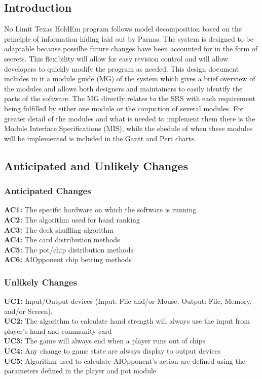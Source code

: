 \documentclass[11pt]{article}
\begin{document}
    \subsection{Introduction}
    No Limit Texas HoldEm program follows model decomposition based on the principle of information hiding laid out by Parnas. The system is designed to be adaptable because possilbe future changes have been accounted for in the form of secrets. This flexibility will allow for easy revision control and will allow developers to quickly modify the program as needed. This design document includes in it a module guide (MG) of the system which gives a brief overview of the modules and allows both designers and maintainers to easily identify the parts of the software. The MG directly relates to the SRS with each requirement being fulfilled by either one module or the conjuction of several modules. For greater detail of the modules and what is needed to implement them there is the Module Interface Specifications (MIS), while the shedule of when these modules will be implemented is included in the Gantt and Pert charts.
    \subsection{Anticipated and Unlikely Changes}
    \subsubsection{Anticipated Changes}
    \textbf{AC1:} The specific hardware on which the software is running\\
    \textbf{AC2:} The algorithm used for hand ranking\\
    \textbf{AC3:} The deck shuffling algorithm\\
    \textbf{AC4:} The card distribution methods\\
    \textbf{AC5:} The pot/chip distribution methods\\
    \textbf{AC6:} AIOpponent chip betting methods\\
    
     
    \subsubsection{Unlikely Changes}
    \textbf{UC1:} Input/Output devices (Input: File and/or Mouse, Output: File, Memory, and/or Screen).\\
    \textbf{UC2:} The algorithm to calculate hand strength will always use the input from player’s hand and community card\\
    \textbf{UC3:} The game will always end when a player runs out of chips\\
    \textbf{UC4:} Any change to game state are always display to output devices\\
    \textbf{UC5:} Algorithm used to calculate AIOpponent’s action are defined using the parameters defined in the player and pot module\\
    
\end{document}
